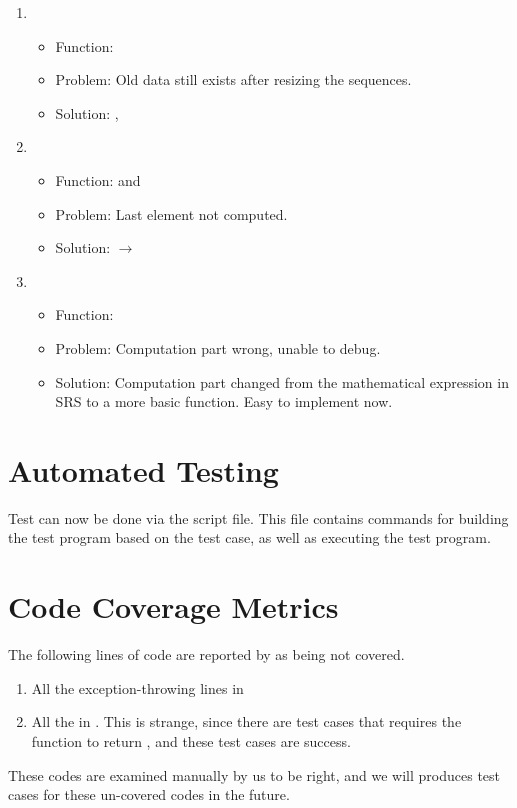 \documentclass[12pt, titlepage]{article}
\begin{document}
\begin{enumerate}
	\item
	\begin{itemize}
		\item Function: 
		\item Problem: Old data still exists after resizing the sequences. 
		\item Solution: ,\\ 
	\end{itemize}
	\item 
	\begin{itemize}
		\item Function:  and 
		\item Problem: Last element not computed. 
		\item Solution: \licpp{<} $\rightarrow$ \licpp{<=}
	\end{itemize}
	\item
	\begin{itemize}
		\item Function: 
		\item Problem: Computation part wrong, unable to debug. 
		\item Solution: Computation part changed from the mathematical expression in SRS to a more basic function. Easy to implement now.
	\end{itemize}
\end{enumerate}

\section{Automated Testing}
Test can now be done via the  script file. This file contains commands for building the test program based on the test case, as well as executing the test program.
	

\section{Code Coverage Metrics}
The following lines of code are reported by  as being not covered.
\begin{enumerate}
	\item All the exception-throwing lines in 
	\item All the  in . This is strange, since there are test cases that requires the function to return , and these test cases are success.
\end{enumerate}
These codes are examined manually by us to be right, and we will produces test cases for these un-covered codes in the future.




\end{document}
